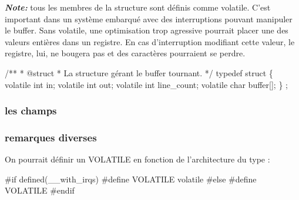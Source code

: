 \documentclass{scrartcl}%
\begin{document}
\textbf{\textit{Note: }} tous les membres de la structure sont définis comme {\Tt{}volatile\nwendquote}. C'est important dans un système embarqué avec des interruptions pouvant manipuler le buffer. Sans {\Tt{}volatile\nwendquote}, une optimisation trop agressive pourrait placer une des valeurs entières dans un registre. En cas d'interruption modifiant cette valeur, le registre, lui, ne bougera pas et des caractères pourraient se perdre.

\nwenddocs{}\endmoddef\nwstartdeflinemarkup{}\nwenddeflinemarkup
/**
 * @struct 
 * La structure gérant le buffer tournant.
 */
typedef struct \{
    volatile int in;
    volatile int out;
    volatile int line_count;
    volatile char buffer[];
\} ;

\nwendcode{}\nwdocspar
\noindent\makebox[\linewidth]{\rule{\paperwidth}{0.4pt}}
\subsubsection{les champs}
\subsubsection{remarques diverses}
On pourrait définir un {\Tt{}VOLATILE\nwendquote} en fonction de l'architecture du type :

\nwenddocs{}\endmoddef\nwstartdeflinemarkup{}\nwenddeflinemarkup
#if defined(__with_irqs)
  #define VOLATILE volatile
#else
  #define VOLATILE
#endif
\end{document}
